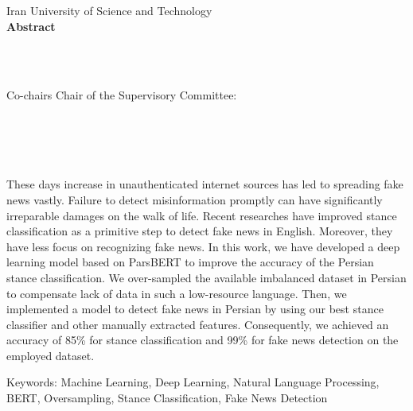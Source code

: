 
\thispagestyle{empty}
\begin{centering}
\vspace{1in}
Iran University of Science and Technology \\
\vspace*{1.\baselineskip}
{\bf Abstract}\\
\vspace*{1\baselineskip}

{\thesisTitle}\\ %
\vspace*{1.\baselineskip}
{\authorName} \\ %
\vspace*{1.\baselineskip}


\ifdefined\secondAdvisor
    Co-chairs
    \else
    Chair
\fi
of the Supervisory Committee:\\ %
\advisorTitle~\advisor\\ \vspace{-.5em} \advisorDepartment \\
\ifdefined\secondAdvisor
    \secondAdvisorTitle~\secondAdvisor\\\vspace{-.5em}\secondAdvisorDepartment \\
\fi
\end{centering}
\vspace*{\baselineskip}
These days increase in unauthenticated internet sources has led to spreading fake news vastly. Failure to detect misinformation promptly can have signiﬁcantly irreparable damages on the walk of life. Recent researches have improved stance classiﬁcation as a primitive step to detect fake news in English. Moreover, they have less focus on recognizing fake news. In this work, we have developed a deep learning model based on ParsBERT to improve the accuracy of the Persian stance classiﬁcation. We over-sampled the available imbalanced dataset in Persian to compensate lack of data in such a low-resource language. Then, we implemented a model to detect fake news in Persian by using our best stance classifier and other manually extracted features. Consequently, we achieved an accuracy of 85\% for stance classification and 99\% for fake news detection on the employed dataset.

\bigbreak
\vspace*{3cm}
\bigbreak
Keywords: Machine Learning, Deep Learning, Natural Language Processing, BERT, Oversampling, Stance Classification, Fake News Detection